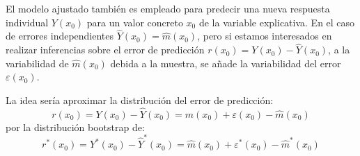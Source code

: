 \documentclass[]{book}
\newenvironment{Shaded}{\begin{snugshade}}{\end{snugshade}}
\newcommand{\KeywordTok}[1]{\textcolor[rgb]{0.13,0.29,0.53}{\textbf{#1}}}
\newcommand{\DataTypeTok}[1]{\textcolor[rgb]{0.13,0.29,0.53}{#1}}
\newcommand{\DecValTok}[1]{\textcolor[rgb]{0.00,0.00,0.81}{#1}}
\newcommand{\FloatTok}[1]{\textcolor[rgb]{0.00,0.00,0.81}{#1}}
\newcommand{\StringTok}[1]{\textcolor[rgb]{0.31,0.60,0.02}{#1}}
\newcommand{\CommentTok}[1]{\textcolor[rgb]{0.56,0.35,0.01}{\textit{#1}}}
\newcommand{\OtherTok}[1]{\textcolor[rgb]{0.56,0.35,0.01}{#1}}
\newcommand{\ControlFlowTok}[1]{\textcolor[rgb]{0.13,0.29,0.53}{\textbf{#1}}}
\newcommand{\OperatorTok}[1]{\textcolor[rgb]{0.81,0.36,0.00}{\textbf{#1}}}
\newcommand{\NormalTok}[1]{#1}
\theoremstyle{break}
\theoremstyle{definition}
\theoremstyle{definition}
\theoremstyle{definition}
\theoremstyle{remark}
\begin{document}
El modelo ajustado también es empleado para predecir una nueva respuesta
individual \(Y(x_0)\) para un valor concreto \(x_0\) de la variable
explicativa. En el caso de errores independientes
\(\hat{Y}(x_0) = \hat{m}(x_0)\), pero si estamos interesados en realizar
inferencias sobre el error de predicción
\(r(x_0) = Y(x_0) - \hat{Y}(x_0)\), a la variabilidad de
\(\hat{m}(x_0)\) debida a la muestra, se añade la variabilidad del error
\(\varepsilon(x_0)\).

La idea sería aproximar la distribución del error de predicción:
\[r(x_0) = Y(x_0) - \hat{Y}(x_0) = m(x_0) + \varepsilon(x_0) - \hat{m}(x_0)\]
por la distribución bootstrap de:
\[r^{\ast}(x_0) = Y^{\ast}(x_0) - \hat{Y}^{\ast}(x_0) = \hat{m}(x_0) + \varepsilon^{\ast}(x_0) - \hat{m}^{\ast}(x_0)\]

\begin{Shaded}
\end{Shaded}
\end{document}
